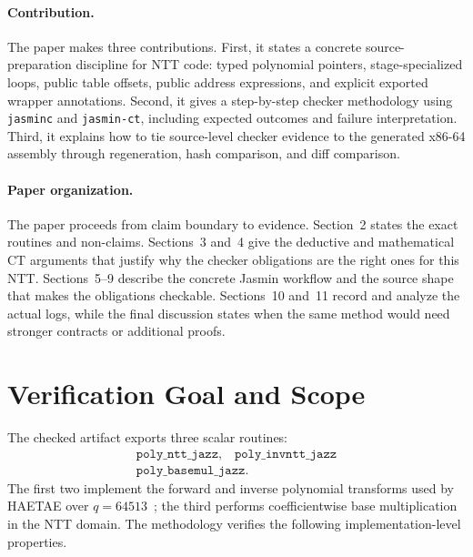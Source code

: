 \documentclass[10pt,twocolumn]{article}
\newcommand{\haetae}{HAETAE}
\begin{document}
\paragraph{Contribution.}
The paper makes three contributions.
First, it states a concrete source-preparation discipline for NTT code: typed
polynomial pointers, stage-specialized loops, public table offsets, public
address expressions, and explicit exported wrapper annotations.  Second, it
gives a step-by-step checker methodology using \texttt{jasminc} and
\texttt{jasmin-ct}, including expected outcomes and failure interpretation.
Third, it explains how to tie source-level checker evidence to the generated
x86-64 assembly through regeneration, hash comparison, and diff comparison.

\paragraph{Paper organization.}
The paper proceeds from claim boundary to evidence.  Section~2 states the exact
routines and non-claims.  Sections~3 and~4 give the deductive and mathematical
CT arguments that justify why the checker obligations are the right ones for
this NTT.  Sections~5--9 describe the concrete Jasmin workflow and the source
shape that makes the obligations checkable.  Sections~10 and~11 record and
analyze the actual logs, while the final discussion states when the same method
would need stronger contracts or additional proofs.

\section{Verification Goal and Scope}

The checked artifact exports three scalar routines:
\[
\begin{array}{c}
  \texttt{poly\_ntt\_jazz},\quad \texttt{poly\_invntt\_jazz}\\
  \texttt{poly\_basemul\_jazz}.
\end{array}
\]
The first two implement the forward and inverse polynomial transforms used by
\haetae{} over \(q=64513\)~\cite{HAETAE2022}; the third performs coefficientwise
base multiplication in the NTT domain.  The methodology verifies the following
implementation-level properties.
\end{document}
